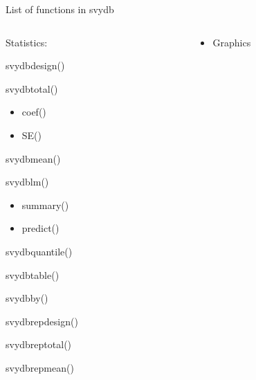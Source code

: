 \documentclass{beamer}
\begin{document}
\begin{frame}[t]{List of functions in svydb}
\begin{columns}[t]
    \begin{column}{0.48\textwidth}
        \begin{itemize}
            \item{Statistics:\\
                \begin{itemize}
                    {\ttfamily
                        \item svydbdesign()
                        \item svydbtotal()
                        \begin{itemize}
                            \item coef()
                            \item SE()
                        \end{itemize}
                        \item svydbmean()
                        \item svydblm()
                        \begin{itemize}
                            \item summary()
                            \item predict()
                        \end{itemize}
                        \item svydbquantile()
                        \item svydbtable()
                        \item svydbby()
                        \item svydbrepdesign()
                        \item svydbreptotal()
                        \item svydbrepmean()
                    }
                \end{itemize}
            }
        \end{itemize}
    \end{column}
    \begin{column}{0.48\textwidth}
        \begin{itemize}
            \item{Graphics\\
            }
        \end{itemize}
    \end{column}
\end{columns}
\end{frame}
\end{document}
